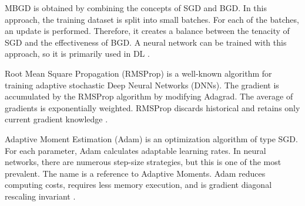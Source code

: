 \documentclass[12pt]{diazessay}
\newcounter{subsubsubsection}[subsubsection]
\begin{document}
    MBGD is obtained by combining the concepts of SGD and BGD. In this approach, the training dataset is split into small batches. For each of the batches, an update is performed. Therefore, it creates a balance between the tenacity of SGD and the effectiveness of BGD. A neural network can be trained with this approach, so it is primarily used in DL \cite{ray2019quick}. 



    \hspace{0.7cm} Root Mean Square Propagation (RMSProp) is a well-known algorithm for training adaptive stochastic Deep Neural Networks (DNNs). The gradient is accumulated by the RMSProp algorithm by modifying Adagrad. The average of gradients is exponentially weighted. RMSProp discards historical and retains only current gradient knowledge \cite{haji2021comparison}.

    \hspace{0.7cm} Adaptive Moment Estimation (Adam) is an optimization algorithm of type SGD. For each parameter, Adam calculates adaptable learning rates. In neural networks, there are numerous step-size strategies, but this is one of the most prevalent. The name is a reference to Adaptive Moments. Adam reduces computing costs, requires less memory execution, and is gradient diagonal rescaling invariant \cite{haji2021comparison}. 
\end{document}

